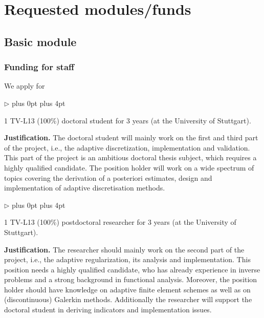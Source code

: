 \documentclass[enabledeprecatedfontcommands,cleardoublepage=empty,headsepline,twoside,11pt,DIV=15,BCOR=12mm,final]{scrartcl}
\renewenvironment{itemize}
{\begin{list}{$\triangleright$}{\labelwidth-2mm \leftmargin3mm %
  \itemsep5pt plus 0pt  \topsep3pt \parsep1pt plus 4pt \labelsep2mm}}
{\end{list}}
\begin{document}
\section{Requested modules/funds}
\label{sec:moduls}

\subsection{Basic module}

\subsubsection{Funding for staff}

We apply for
\begin{itemize}\itemsep=0pt
\item 1 TV-L13 (100\%) doctoral student
  for 3 years (at the University of Stuttgart).
\end{itemize}
\textbf{Justification.} 
The doctoral student will mainly work on the first and third part of the project, i.e., the adaptive discretization, implementation and validation. This part of the project is an ambitious doctoral thesis subject, which requires a highly qualified candidate. The position holder will work on a wide spectrum of topics covering the derivation of a posteriori estimates, design and implementation of adaptive discretisation methods.

\begin{itemize}\itemsep=0pt
\item 1 TV-L13 (100\%) postdoctoral researcher
  for 3 years (at the University of Stuttgart).
\end{itemize}
\textbf{Justification.} 
The researcher should mainly work on the second part of the project, i.e., the adaptive regularization, its analysis and implementation. This position needs a highly qualified candidate, who has already experience in inverse problems and a strong background in functional analysis. Moreover, the position holder should have knowledge on adaptive finite element schemes as well as on (discontinuous) Galerkin methods. Additionally the researcher will support the doctoral student in deriving indicators and implementation issues. %
\end{document}
